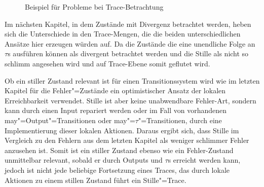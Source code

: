 \begin{figure}[htbp]
  \begin{center}
    \caption{Beispiel für Probleme bei Trace-Betrachtung}
    \label{QuiTracesBsp}
  \end{center}
\end{figure}

Im nächsten Kapitel, in dem Zustände mit Divergenz betrachtet werden, heben
sich die Unterschiede in den Trace-Mengen, die die beiden unterschiedlichen
Ansätze hier erzeugen würden auf. Da die Zustände die eine unendliche Folge an
$\tau$s ausführen können als divergent betrachtet werden und die Stille als
nicht so schlimm angesehen wird und auf Trace-Ebene somit geflutet wird.

Ob ein stiller Zustand relevant ist für einen Transitionssystem wird wie im
letzten Kapitel für die Fehler"=Zustände ein optimistischer Ansatz der lokalen
Erreichbarkeit verwendet. Stille ist aber keine unabwendbare \glqq
Fehler-Art\grqq{}, sondern kann durch einen Input repariert werden oder im Fall
von vorhandenen may"=Output"=Transitionen oder may"=$\tau$"=Transitionen, durch
eine Implementierung dieser lokalen Aktionen. Daraus ergibt sich, dass Stille
im Vergleich zu den Fehlern aus dem letzten Kapitel als weniger \glqq schlimmer
Fehler\grqq{} anzusehen ist. Somit ist ein stiller Zustand ebenso wie ein
Fehler-Zustand unmittelbar relevant, sobald er durch Outputs und $\tau$s
erreicht werden kann, jedoch ist nicht jede beliebige Fortsetzung eines Traces,
das durch lokale Aktionen zu einem stillen Zustand führt ein Stille"=Trace.

